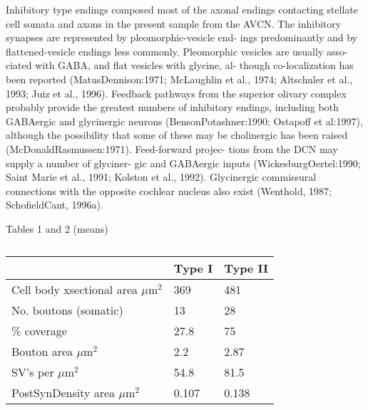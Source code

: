 \documentclass[10pt,a4paper]{article}
\newcommand{\umsq}{$\mu$m$^2$}
\begin{document}
\textsf{Inhibitory type endings composed most of the axonal endings contacting
  stellate cell somata and axons in the present sample from the AVCN. The
  inhibitory synapses are represented by pleomorphic-vesicle end- ings
  predominantly and by flattened-vesicle endings less commonly. Pleomorphic
  vesicles are usually asso- ciated with GABA, and flat vesicles with glycine,
  al- though co-localization has been reported (MatusDennison:1971; McLaughlin
  et al., 1974; Altschuler et al., 1993; Juiz et al., 1996). Feedback pathways
  from the superior olivary complex probably provide the greatest numbers of
  inhibitory endings, including both GABAergic and glycinergic neurons
  (BensonPotashner:1990; Ostapoff et al:1997), although the possibility that
  some of these may be cholinergic has been raised
  (McDonaldRasmussen:1971). Feed-forward projec- tions from the DCN may supply a
  number of glyciner- gic and GABAergic inputs (WickesburgOertel:1990; Saint
  Marie et al., 1991; Kolston et al., 1992). Glycinergic commissural connections
  with the opposite cochlear nucleus also exist (Wenthold, 1987; SchofieldCant,
  1996a).}







\citep{ReddCahillEtAl:2002} Tables 1 and 2 (means)

\begin{table}[h]
\caption{\citep[Table 1 in ][]{ReddCahillEtAl:2002}}

  \begin{tabularx}{\textwidth}{XXX}
\toprule
                                & Type I & Type II \\\midrule
Cell body xsectional area \umsq &  369   & 481     \\ 
     No. boutons (somatic)      &  13    & 28      \\
          \% coverage           &  27.8  & 75      \\  
       Bouton area \umsq        &  2.2   & 2.87    \\
SV{\textquoteright}s per \umsq  &  54.8  & 81.5    \\
   PostSynDensity area \umsq    & 0.107  & 0.138   \\
\bottomrule
\end{tabularx}
\end{table}
\end{document}
